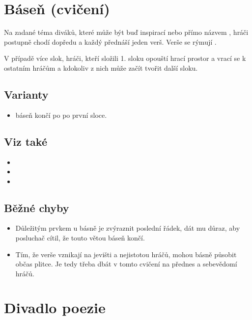 \documentclass[main.tex]{subfiles}
\begin{document}
 
 
 
 
\needspace{5cm} \section{Báseň (cvičení)} \label{báseň (cvičení)} Na zadané téma diváků, které může být buď inspirací nebo přímo názvem , hráči postupně chodí dopředu a každý přednáší  
jeden verš. Verše se rýmují . 
 
V případě více slok, hráči, kteří složili 1. sloku opouští hrací prostor a vrací se k ostatním hráčům a kdokoliv z nich může začít tvořit 
další sloku. 
 
\subsection{Varianty} \begin{itemize}
\item  báseň končí po po první sloce.
\end{itemize}
  
\subsection{Viz také} \begin{itemize}
\item {}
\item {}
\item {}
\end{itemize}
 
\subsection{Běžné chyby} \begin{itemize}
\item Důležitým prvkem u básně je zvýraznit poslední řádek, dát mu důraz, aby posluchač cítil, že touto větou báseň končí.
\item Tím, že verše vznikají na jevišti a nejistotou hráčů, mohou básně působit občas plitce. Je tedy třeba dbát v tomto cvičení na přednes a sebevědomí hráčů.
\end{itemize}
 
 
 
 
\needspace{5cm} \section{Divadlo poezie} \label{divadlo poezie}  
 
\end{document}
